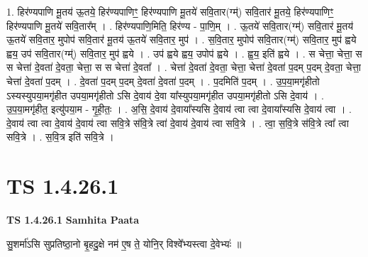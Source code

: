 \documentclass[17pt]{extarticle}
\begin{document}
1. हिर॑ण्यपाणि मू॒तय॑ ऊ॒तये॒ हिर॑ण्यपाणिꣳ॒॒ हिर॑ण्यपाणि मू॒तये॑ सवि॒तार(ग्म्॑) सवि॒तार॑ मू॒तये॒ हिर॑ण्यपाणिꣳ॒॒ हिर॑ण्यपाणि मू॒तये॑ सवि॒तार᳚म् । . हिर॑ण्यपाणि॒मिति॒ हिर॑ण्य - पा॒णि॒म् । . ऊ॒तये॑ सवि॒तार(ग्म्॑) सवि॒तार॑ मू॒तय॑ ऊ॒तये॑ सवि॒तार॒ मुपोप॑ सवि॒तार॑ मू॒तय॑ ऊ॒तये॑ सवि॒तार॒ मुप॑ । . स॒वि॒तार॒ मुपोप॑ सवि॒तार(ग्म्॑) सवि॒तार॒ मुप॑ ह्वये ह्वय॒ उप॑ सवि॒तार(ग्म्॑) सवि॒तार॒ मुप॑ ह्वये । . उप॑ ह्वये ह्वय॒ उपोप॑ ह्वये । . ह्व॒य॒ इति॑ ह्वये । . स चेत्ता॒ चेत्ता॒ स स चेत्ता॑ दे॒वता॑ दे॒वता॒ चेत्ता॒ स स चेत्ता॑ दे॒वता᳚ । . चेत्ता॑ दे॒वता॑ दे॒वता॒ चेत्ता॒ चेत्ता॑ दे॒वता॑ प॒दम् प॒दम् दे॒वता॒ चेत्ता॒ चेत्ता॑ दे॒वता॑ प॒दम् । . दे॒वता॑ प॒दम् प॒दम् दे॒वता॑ दे॒वता॑ प॒दम् । . प॒दमिति॑ प॒दम् । . उ॒प॒या॒मगृ॑हीतो ऽस्यस्युपया॒मगृ॑हीत उपया॒मगृ॑हीतो ऽसि दे॒वाय॑ दे॒वा या᳚स्युपया॒मगृ॑हीत उपया॒मगृ॑हीतो ऽसि दे॒वाय॑ । . उ॒प॒या॒मगृ॑हीत॒ इत्यु॑पया॒म - गृ॒ही॒तः॒ । . अ॒सि॒ दे॒वाय॑ दे॒वाया᳚स्यसि दे॒वाय॑ त्वा त्वा दे॒वाया᳚स्यसि दे॒वाय॑ त्वा । . दे॒वाय॑ त्वा त्वा दे॒वाय॑ दे॒वाय॑ त्वा सवि॒त्रे स॑वि॒त्रे त्वा॑ दे॒वाय॑ दे॒वाय॑ त्वा सवि॒त्रे । . त्वा॒ स॒वि॒त्रे स॑वि॒त्रे त्वा᳚ त्वा सवि॒त्रे । . स॒वि॒त्र इति॑ सवि॒त्रे । \newline
\pagebreak
{}

\section{ TS 1.4.26.1 }

\textbf{TS 1.4.26.1 } \newline
\textbf{Samhita Paata} \newline

सु॒शर्मा॑ऽसि सुप्रतिष्ठा॒नो बृ॒हदु॒क्षे नम॑ ए॒ष ते॒ योनि॒र् विश्वे᳚भ्यस्त्वा दे॒वेभ्यः॑ ॥ \newline
\end{document}

